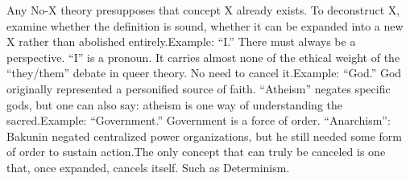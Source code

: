 \documentclass[11pt]{article}
\renewcommand{\\}[1][\mynewlineskip]{\oldnewline[#1]}
\begin{document}
\vspace{1em}
Any No-X theory presupposes that concept X already exists. To deconstruct X, examine whether the definition is sound, whether it can be expanded into a new X rather than abolished entirely.\\
Example: ``I.'' There must always be a perspective. ``I'' is a pronoun. It carries almost none of the ethical weight of the ``they/them'' debate in queer theory. No need to cancel it.\\
Example: ``God.'' God originally represented a personified source of faith. ``Atheism'' negates specific gods, but one can also say: atheism is one way of understanding the sacred.\\
Example: ``Government.'' Government is a force of order. ``Anarchism'': Bakunin negated centralized power organizations, but he still needed some form of order to sustain action.\\
The only concept that can truly be canceled is one that, once expanded, cancels itself. Such as Determinism.
\end{document}
